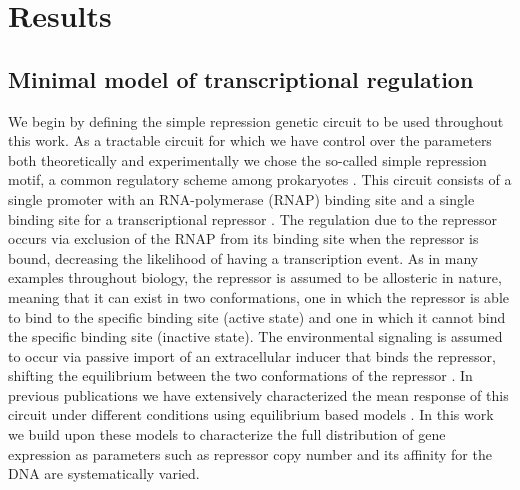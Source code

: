\section{Results}

\subsection{Minimal model of transcriptional regulation}

We begin by defining the simple repression genetic circuit to be used throughout
this work. As a tractable circuit for which we have control over the parameters
both theoretically and experimentally we chose the so-called simple  repression
motif, a common regulatory scheme among prokaryotes \cite{Rydenfelt2014}. This
circuit consists of a single promoter with an RNA-polymerase (RNAP) binding site
and a single binding site for a transcriptional repressor \cite{Garcia2011c}.
The regulation due to the repressor occurs via exclusion of the RNAP from its
binding site when the repressor is bound, decreasing the likelihood of having a
transcription event. As in many examples throughout biology, the repressor is
assumed to be allosteric in nature, meaning that it can exist in two
conformations, one in which the repressor is able to bind to the specific
binding site (active state) and one in which it cannot bind the specific binding
site (inactive state). The environmental signaling is assumed to occur via
passive import of an extracellular inducer that binds the repressor, shifting
the equilibrium between the two conformations of the repressor
\cite{Razo-Mejia2018}. In previous publications we have extensively
characterized the mean response of this circuit under different conditions using
equilibrium based models . In this work we build upon
these models to characterize the full distribution of gene expression as
parameters such as repressor copy number and its affinity for the DNA are
systematically varied.

